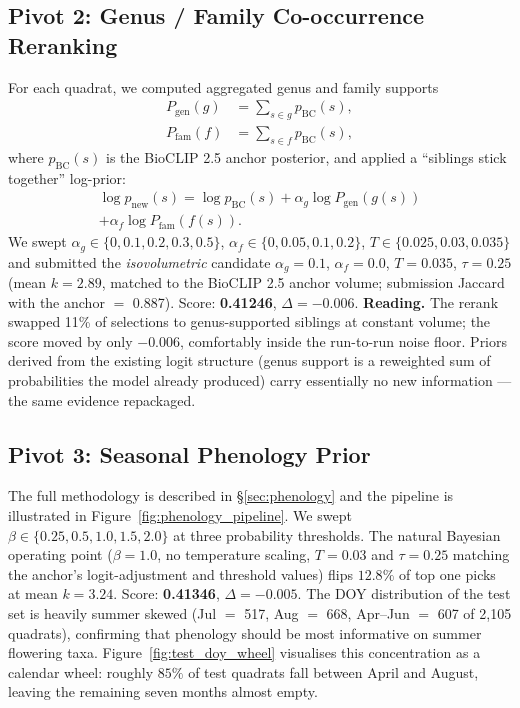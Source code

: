 \documentclass[sigconf]{ceurart}
\begin{document}
\subsection{Pivot 2: Genus / Family Co-occurrence Reranking}
\label{sec:pivot2}
For each quadrat, we computed aggregated genus and family supports
\begin{align}
P_{\text{gen}}(g) &= \!\!\sum_{s\in g}\! p_{\text{BC}}(s), \\
P_{\text{fam}}(f) &= \!\!\sum_{s\in f}\! p_{\text{BC}}(s),
\end{align}
where $p_{\text{BC}}(s)$ is the BioCLIP 2.5 anchor posterior, and applied a ``siblings stick together'' log-prior:
\begin{multline}
\log p_{\text{new}}(s) = \log p_{\text{BC}}(s) + \alpha_g \log P_{\text{gen}}(g(s)) \\ + \alpha_f \log P_{\text{fam}}(f(s)).
\end{multline}
We swept $\alpha_g \in \{0,0.1,0.2,0.3,0.5\}$, $\alpha_f \in \{0,0.05,0.1,0.2\}$, $T \in \{0.025,0.03,0.035\}$ and submitted the \emph{isovolumetric} candidate $\alpha_g{=}0.1$, $\alpha_f{=}0.0$, $T{=}0.035$, $\tau{=}0.25$ (mean $k{=}2.89$, matched to the BioCLIP 2.5 anchor volume; submission Jaccard with the anchor $=$ 0.887). Score: \textbf{0.41246}, $\Delta = -0.006$.
\textbf{Reading.} The rerank swapped 11\% of selections to genus-supported siblings at constant volume; the score moved by only $-0.006$, comfortably inside the run-to-run noise floor. Priors derived from the existing logit structure (genus support is a reweighted sum of probabilities the model already produced) carry essentially no new information --- the same evidence repackaged.
\subsection{Pivot 3: Seasonal Phenology Prior}
\label{sec:pivot3}
The full methodology is described in \S\ref{sec:phenology} and the pipeline is illustrated in Figure~\ref{fig:phenology_pipeline}. We swept $\beta \in \{0.25, 0.5, 1.0, 1.5, 2.0\}$ at three probability thresholds. The natural Bayesian operating point ($\beta{=}1.0$, no temperature scaling, $T{=}0.03$ and $\tau{=}0.25$ matching the anchor's logit-adjustment and threshold values) flips $12.8\%$ of top one picks at mean $k{=}3.24$. Score: \textbf{0.41346}, $\Delta = -0.005$.
The DOY distribution of the test set is heavily summer skewed (Jul $=$ 517, Aug $=$ 668, Apr--Jun $=$ 607 of 2{,}105 quadrats), confirming that phenology should be most informative on summer flowering taxa. Figure~\ref{fig:test_doy_wheel} visualises this concentration as a calendar wheel: roughly $85\%$ of test quadrats fall between April and August, leaving the remaining seven months almost empty.
\end{document}
